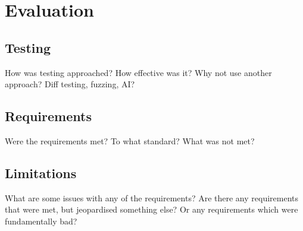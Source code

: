 \chapter{Evaluation}


\section{Testing}
How was testing approached?
How effective was it?
Why not use another approach? Diff testing, fuzzing, AI?

\section{Requirements}
Were the requirements met?
To what standard?
What was not met?

\section{Limitations}
What are some issues with any of the requirements?
Are there any requirements that were met, but jeopardised something else? 
Or any requirements which were fundamentally bad?